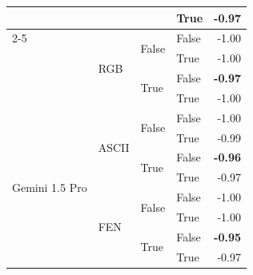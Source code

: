 \begin{tabular}{@{}llllr@{}}
                                                &                           &                           & True                      &  -0.97 \\
    \cmidrule{2-5}                                                                                                                      
                                                & \multirow[c]{4}{*}{RGB}   & \multirow[c]{2}{*}{False} & False                     &  -1.00 \\
                                                &                           &                           & True                      &  -1.00 \\
                                                &                           & \multirow[c]{2}{*}{True}  & False                     &  \textbf{-0.97} \\
                                                &                           &                           & True                      &  -1.00 \\
    \midrule    
    \multirow[c]{17}{*}{Gemini 1.5 Pro}         & \multirow[c]{4}{*}{ASCII} & \multirow[c]{2}{*}{False} & False                     & -1.00 \\
                                                &                           &                           & True                      & -0.99 \\
                                                &                           & \multirow[c]{2}{*}{True}  & False                     & \textbf{-0.96} \\
                                                &                           &                           & True                      & -0.97 \\
    \cmidrule{2-5}                                                                                                                       
                                                & \multirow[c]{4}{*}{FEN}   & \multirow[c]{2}{*}{False} & False                     & -1.00 \\
                                                &                           &                           & True                      & -1.00 \\
                                                &                           & \multirow[c]{2}{*}{True}  & False                     & \textbf{-0.95} \\
                                                &                           &                           & True                      & -0.97 \\

\end{tabular}
